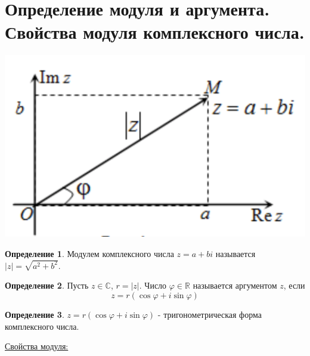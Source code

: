 \documentclass[12pt,letterpaper]{report}
\theoremstyle{definition}
\newtheorem*{conj}{Определение}
\begin{document}
\section{Определение модуля и аргумента. Свойства модуля комплексного числа.}
\includegraphics[scale=0.75]{Complex_number_on_plane.png} 
\begin{conj}
  Модулем комплексного числа $z = a + bi$ называется $|z| = \sqrt{a^2 + b^2}$.
\end{conj}
\begin{conj}
  Пусть $z \in \mathbb{C}$, $r = |z|$. Число $\varphi \in \mathbb{R}$ называется аргументом $z$, если 
  \[ z = r(\cos\varphi + i\sin\varphi) \]
\end{conj}
\begin{conj}
  $ z = r(\cos\varphi + i\sin\varphi)$ - тригонометрическая форма комплексного числа.
\end{conj}
\underline{Свойства модуля:}
\end{document}
